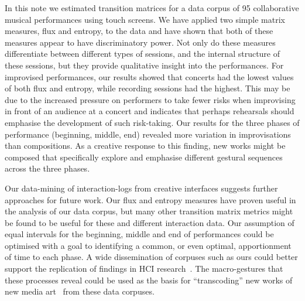 \documentclass{sigchi}
\begin{document}
In this note we estimated transition matrices 
for a data corpus of 95 collaborative musical performances using touch screens.
We have applied two simple matrix
measures, flux and entropy, to the data and have shown that
 both of these measures appear to 
have discriminatory power. Not only do these measures
differentiate between different types of sessions, and the internal
structure of these sessions, but they provide qualitative insight into the
performances. For improvised performances, our results showed that concerts
had the lowest values of both flux and entropy, while recording sessions had
the highest. This may be due to the increased pressure on performers to take fewer risks
when improvising in front of an audience at a concert and indicates that perhaps rehearsals should 
emphasise the development of such risk-taking. 
Our results for the three phases of performance (beginning, middle, end)
revealed more variation in
improvisations than compositions. As a creative
 response to this finding, 
new works might be
composed that specifically explore and emphasise different gestural sequences across the three phases.

Our data-mining of interaction-logs from creative interfaces suggests
further approaches for future work.
Our flux and entropy measures have proven useful
in the analysis of our data corpus, but many other transition matrix
metrics might be found to be useful for these and different interaction data.
Our assumption of equal intervals for the beginning, middle and end of performances could be 
optimised with a goal to identifying a common, or even optimal, apportionment of time to each phase.  
A wide dissemination of corpuses such as ours could better support the replication of findings in HCI
research~\cite{Wilson:2011ve}. The macro-gestures that these
processes reveal could be used as the basis for ``transcoding'' new works of new media
art~\cite{Manovich:2002ly} from these data corpuses.

\pagebreak


\end{document}
